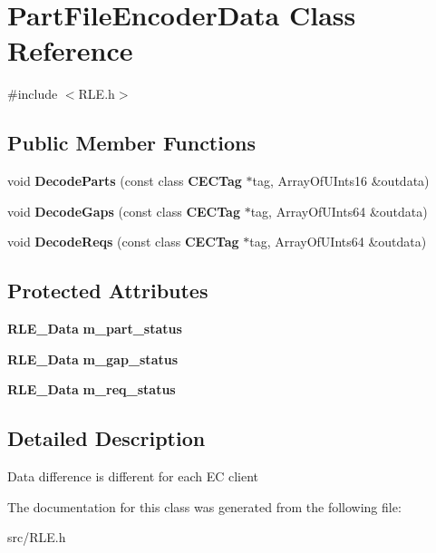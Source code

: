 \section{PartFileEncoderData Class Reference}
\label{classPartFileEncoderData}


{\ttfamily \#include $<$RLE.h$>$}\subsection*{Public Member Functions}
\begin{DoxyCompactItemize}
\item 
void {\bfseries DecodeParts} (const class {\bf CECTag} $\ast$tag, ArrayOfUInts16 \&outdata)\label{classPartFileEncoderData_a5c9ea0bac1afd3a97cb2ab67f6e9cc11}

\item 
void {\bfseries DecodeGaps} (const class {\bf CECTag} $\ast$tag, ArrayOfUInts64 \&outdata)\label{classPartFileEncoderData_a466b3cbcbfc121e8d12fb670b1cbac67}

\item 
void {\bfseries DecodeReqs} (const class {\bf CECTag} $\ast$tag, ArrayOfUInts64 \&outdata)\label{classPartFileEncoderData_af7db6abfba70be95340d28ca1859c6c0}

\end{DoxyCompactItemize}
\subsection*{Protected Attributes}
\begin{DoxyCompactItemize}
\item 
{\bf RLE\_\-Data} {\bfseries m\_\-part\_\-status}\label{classPartFileEncoderData_ac53df62359f459358039120f41f4cdf2}

\item 
{\bf RLE\_\-Data} {\bfseries m\_\-gap\_\-status}\label{classPartFileEncoderData_a4b3ab90db6c1b8d3b9663ed0200506c9}

\item 
{\bf RLE\_\-Data} {\bfseries m\_\-req\_\-status}\label{classPartFileEncoderData_a5e7c32da0fae843f8676094aa4acc5a8}

\end{DoxyCompactItemize}


\subsection{Detailed Description}
Data difference is different for each EC client 

The documentation for this class was generated from the following file:\begin{DoxyCompactItemize}
\item 
src/RLE.h\end{DoxyCompactItemize}
